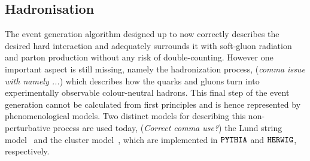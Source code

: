 \subsection{Hadronisation} \label{sec::Hadronisation}
The event generation algorithm designed up to now correctly describes the desired hard interaction and adequately surrounds it with soft-gluon radiation and parton production without any risk of double-counting. However one important aspect is still missing, namely the hadronization process, (\textit{comma issue with namely ...}) which describes how the quarks and gluons turn into experimentally observable colour-neutral hadrons.
This final step of the event generation cannot be calculated from first principles and is hence represented by phenomenological models.
Two distinct models for describing this non-perturbative process are used today, (\textit{Correct comma use?}) the Lund string model~\cite{Lund} and the cluster model~\cite{ClusterModel}, which are implemented in $\texttt{PYTHIA}$ and $\texttt{HERWIG}$, respectively.

